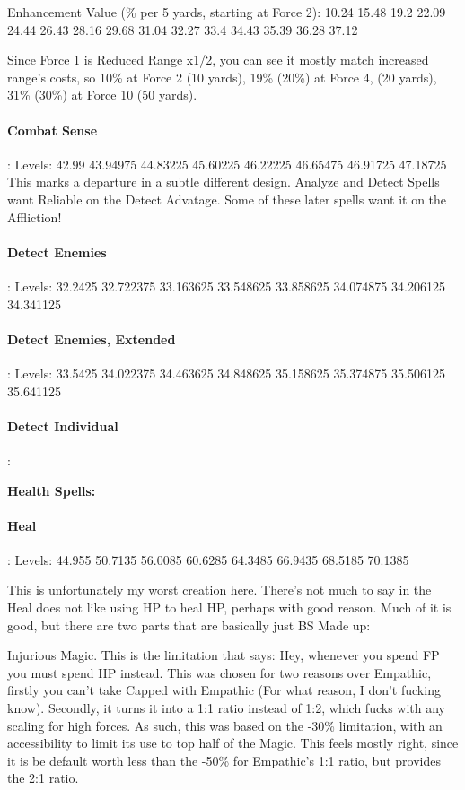 \begin{multicols*}{2}
	Enhancement Value (\% per 5 yards, starting at Force 2): 10.24 15.48 19.2 22.09 24.44 26.43 28.16 29.68 31.04 32.27 33.4 34.43 35.39 36.28 37.12
	
	Since Force 1 is Reduced Range x1/2, you can see it mostly match increased range's costs, so 10\% at Force 2 (10 yards), 19\% (20\%) at Force 4, (20 yards), 31\% (30\%) at Force 10 (50 yards).
	
	\paragraph{Combat Sense}: Levels: 42.99 43.94975 44.83225 45.60225 46.22225 46.65475 46.91725 47.18725
	This marks a departure in a subtle different design. Analyze and Detect Spells want Reliable on the Detect Advatage. Some of these later spells want it on the Affliction!
	
	\paragraph{Detect Enemies}: Levels: 32.2425 32.722375 33.163625 33.548625 33.858625 34.074875 34.206125 34.341125
	
	\paragraph{Detect Enemies, Extended}: Levels: 33.5425 34.022375 34.463625 34.848625 35.158625 35.374875 35.506125 35.641125
	
	\paragraph{Detect Individual}:
	
	\textbf{Health Spells:\\}
	
	\paragraph{Heal}: Levels: 44.955 50.7135 56.0085 60.6285 64.3485 66.9435 68.5185 70.1385
	
	This is unfortunately my worst creation here. There's not much to say in the Heal does not like using HP to heal HP, perhaps with good reason. Much of it is good, but there are two parts that are basically just BS Made up:
	
	Injurious Magic. This is the limitation that says: Hey, whenever you spend FP you must spend HP instead. This was chosen for two reasons over Empathic, firstly you can't take Capped with Empathic (For what reason, I don't fucking know). Secondly, it turns it into a 1:1 ratio instead of 1:2, which fucks with any scaling for high forces. As such, this was based on the -30\% limitation, with an accessibility to limit its use to top half of the Magic. This feels mostly right, since it is be default worth less than the -50\% for Empathic's 1:1 ratio, but provides the 2:1 ratio.
	

\end{multicols*}
